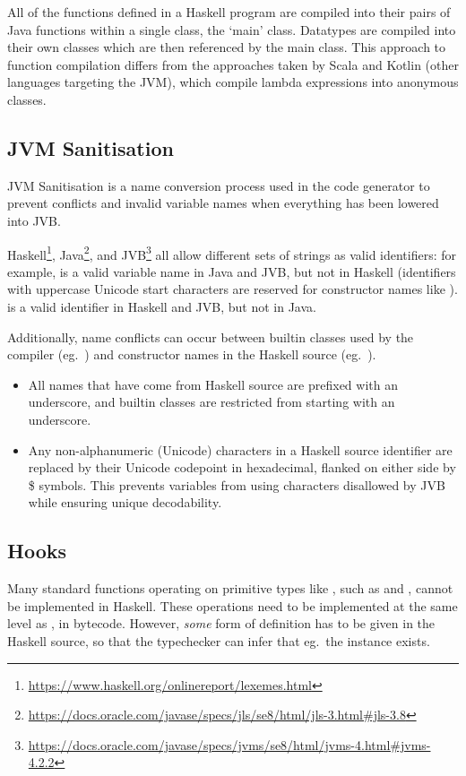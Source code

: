 \documentclass[dissertation.tex]{subfiles}
\begin{document}
{{{            All of the functions defined in a Haskell program are compiled into their pairs of Java functions within a single class, the `main' class. Datatypes are compiled into their own classes which are then referenced by the main class. This approach to function compilation differs from the approaches taken by Scala and Kotlin (other languages targeting the JVM), which compile lambda expressions into anonymous classes.
        }
    }
    \subsection{JVM Sanitisation}\label{sec:jvm-sanitisation}
    {
        JVM Sanitisation is a name conversion process used in the code generator to prevent conflicts and invalid variable names when everything has been lowered into JVB.

        Haskell\footnote{\url{https://www.haskell.org/onlinereport/lexemes.html}}, Java\footnote{\url{https://docs.oracle.com/javase/specs/jls/se8/html/jls-3.html\#jls-3.8}}, and JVB\footnote{\url{https://docs.oracle.com/javase/specs/jvms/se8/html/jvms-4.html\#jvms-4.2.2}} all allow different sets of strings as valid identifiers: for example,  is a valid variable name in Java and JVB, but not in Haskell (identifiers with uppercase Unicode start characters are reserved for constructor names like ). \monospace{(+)} is a valid identifier in Haskell and JVB, but not in Java.

        Additionally, name conflicts can occur between builtin classes used by the compiler (eg.\ ) and constructor names in the Haskell source (eg.\ ).

        \begin{itemize}
        \item
        {
            All names that have come from Haskell source are prefixed with an underscore, and builtin classes are restricted from starting with an underscore.
        }
        \item
        {
            Any non-alphanumeric (Unicode) characters in a Haskell source identifier are replaced by their Unicode codepoint in hexadecimal, flanked on either side by \$ symbols. This prevents variables from using characters disallowed by JVB while ensuring unique decodability.
        }
        \end{itemize}
    }
    \subsection{Hooks}\label{sec:hooks}
    {
        Many standard functions operating on primitive types like , such as \haskell{(+)} and \haskell{(==)}, cannot be implemented in Haskell. These operations need to be implemented at the same level as , in bytecode. However, \textit{some} form of definition has to be given in the Haskell source, so that the typechecker can infer that eg.\ the instance exists.

}}
\end{document}
